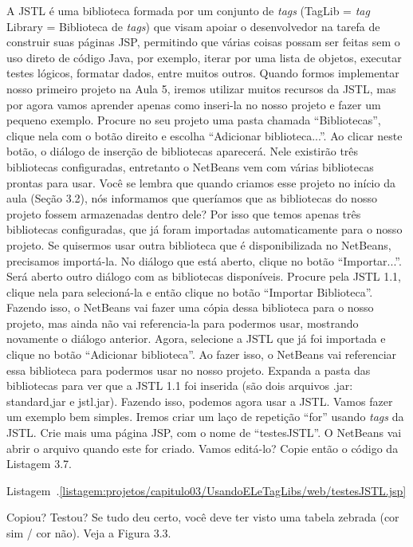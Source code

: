 A JSTL é uma biblioteca formada por um conjunto de \textit{tags} (TagLib = \textit{tag} Library = Biblioteca de \textit{tags}) que visam apoiar o desenvolvedor na tarefa de construir suas páginas JSP, permitindo que várias coisas possam ser feitas sem o uso direto de código Java, por exemplo, iterar por uma lista de objetos, executar testes lógicos, formatar dados, entre muitos outros. Quando formos implementar nosso primeiro projeto na Aula 5, iremos utilizar muitos recursos da JSTL, mas por agora vamos aprender apenas como inseri-la no nosso projeto e fazer um pequeno exemplo.
Procure no seu projeto uma pasta chamada ``Bibliotecas'', clique nela com o botão direito e escolha ``Adicionar biblioteca...''. Ao clicar neste botão, o diálogo de inserção de bibliotecas aparecerá. Nele existirão três bibliotecas configuradas, entretanto o NetBeans vem com várias bibliotecas prontas para usar. Você se lembra que quando criamos esse projeto no início da aula (Seção 3.2), nós informamos que queríamos que as bibliotecas do nosso projeto fossem armazenadas dentro dele? Por isso que temos apenas três bibliotecas configuradas, que já foram importadas automaticamente para o nosso projeto. Se quisermos usar outra biblioteca que é disponibilizada no NetBeans, precisamos importá-la. No diálogo que está aberto, clique no botão ``Importar...''. Será aberto outro diálogo com as bibliotecas disponíveis. Procure pela JSTL 1.1, clique nela para selecioná-la e então clique no botão ``Importar Biblioteca''. Fazendo isso, o NetBeans vai fazer uma cópia dessa biblioteca para o nosso projeto, mas ainda não vai referencia-la para podermos usar, mostrando novamente o diálogo anterior. Agora, selecione a JSTL que já foi importada e clique no botão ``Adicionar biblioteca''. Ao fazer isso, o NetBeans vai referenciar essa biblioteca para podermos usar no nosso projeto. Expanda a pasta das bibliotecas para ver que a JSTL 1.1 foi inserida (são dois arquivos .jar: standard,jar e jstl.jar).
Fazendo isso, podemos agora usar a JSTL. Vamos fazer um exemplo bem simples. Iremos criar um laço de repetição ``for'' usando \textit{tags} da JSTL. Crie mais uma página JSP, com o nome de ``testesJSTL''. O NetBeans vai abrir o arquivo quando este for criado. Vamos editá-lo? Copie então o código da Listagem 3.7.

Listagem~\thechapter.\ref{listagem:projetos/capitulo03/UsandoELeTagLibs/web/testesJSTL.jsp}

Copiou? Testou? Se tudo deu certo, você deve ter visto uma tabela zebrada (cor sim / cor não). Veja a Figura 3.3.

